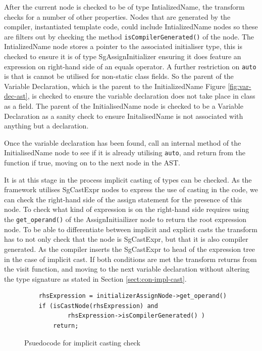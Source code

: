 \documentclass[bsc,frontabs,singlespacing,parskip,deptreport]{infthesis}
\begin{document}
After the current node is checked to be of type IntializedName, the transform checks for a number of other properties. Nodes that are generated by the compiler, instantiated template code, could include IntializedName nodes so these are filters out by checking the method \texttt{isCompilerGenerated()} of the node. The IntializedName node stores a pointer to the associated initialiser type, this is checked to ensure it is of type SgAssignInitializer ensuring it does feature an expression on right-hand side of an equals operator. A further restriction on \texttt{auto} is that is cannot be utilised for non-static class fields. So the parent of the Variable Declaration, which is the parent to the InitializedName Figure \ref{fig:var-dec-ast}, is checked to ensure the variable declaration does not take place in class as a field. The parent of the InitialisedName node is checked to be a Variable Declaration as a sanity check to ensure InitalisedName is not associated with anything but a declaration. 

Once the variable declaration has been found, call an internal method of the InitialisedName node to see if it is already utilising \texttt{auto}, and return from the function if true, moving on to the next node in the AST. 

It is at this stage in the process implicit casting of types can be checked. As the framework utilises SgCastExpr nodes to express the use of casting in the code, we can check the right-hand side of the assign statement for the presence of this node. To check what kind of expression is on the right-hand side  requires using the \texttt{get\_operand()} of the AssignInitiailizer node to return the root expression node. To be able to differentiate between implicit and explicit casts the transform has to not only check that the node is SgCastExpr, but that it is also compiler generated. As the compiler inserts the SgCastExpr to head of the expression tree in the case of implicit cast. If both conditions are met the transform returns from the visit function, and moving to the next variable declaration without altering the type signature as stated in Section \ref{sect:con-impl-cast}. 


\begin{figure}[!h]
    \centering
    \begin{verbatim}
    rhsExpression = initializerAssignNode->get_operand()
    if (isCastNode(rhsExpression) and 
            rhsExpression->isCompilerGenerated() )
        return;
    \end{verbatim}
    \caption{Psuedocode for implicit casting check}
    \label{fig:cast-check-code}
\end{figure}
\end{document}
